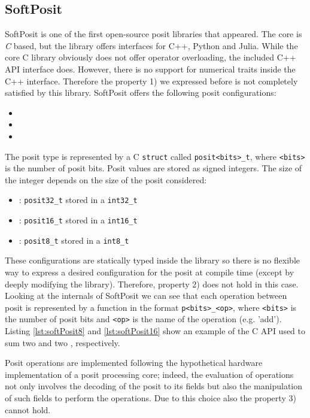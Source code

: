 \subsection{SoftPosit}

SoftPosit \cite{softposit} is one of the first open-source posit libraries that appeared. The core is \textit{C} based, but the library offers interfaces for C++, Python and Julia. 
While the core C library obviously does not offer operator overloading, the included C++ API interface does. However, there is no support for numerical traits inside the C++ interface. Therefore the property 1) we expressed before is not completely satisfied by this library.
SoftPosit offers the following posit configurations:
\begin{itemize}
    \item {}
    \item {}
    \item {}
\end{itemize}


The posit type is represented by a C \texttt{struct} called  \texttt{posit<bits>\_t}, where \texttt{<bits>} is the number of posit bits. Posit values are stored as signed integers. The size of the integer depends on the size of the posit considered:
\begin{itemize}
    \item {}: \texttt{posit32\_t} stored in a \texttt{int32\_t}
    \item {}: \texttt{posit16\_t} stored in a \texttt{int16\_t}
    \item {} : \texttt{posit8\_t}  stored in a \texttt{int8\_t}
\end{itemize}
These configurations are statically typed inside the library so there is no flexible way to express a desired configuration for the posit at compile time (except by deeply modifying the library). Therefore, property 2) does not hold in this case.
Looking at the internals of SoftPosit we can see that each operation between posit is represented by a function in the format \texttt{p<bits>\_<op>}, where \texttt{<bits>} is the number of posit bits and \texttt{<op>} is the name of the operation (e.g. 'add').
Listing \ref{lst:softPosit8} and \ref{lst:softPosit16} show an example of the C API used to sum two  and two , respectively.

Posit operations are implemented following the hypothetical hardware implementation of a posit processing core; indeed, the evaluation of operations not only involves the decoding of the posit to its fields but also the manipulation of such fields to perform the operations. Due to this choice also the property 3) cannot hold.


